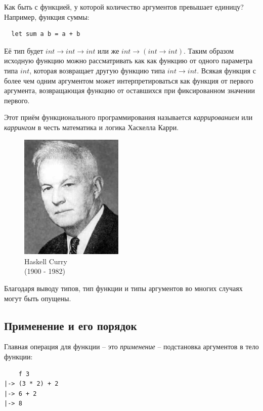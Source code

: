 \documentclass[a4paper,11pt]{article}
\begin{document}
Как быть с функцией, у которой количество аргументов превышает единицу? 
Например, функция суммы:
\begin{lstlisting}
  let sum a b = a + b
\end{lstlisting}

Её тип будет $int \rightarrow int \rightarrow int$ или же $int \rightarrow (int 
\rightarrow int)$. Таким образом исходную функцию можно рассматривать как
как функцию от одного параметра типа $int$, которая возвращает другую функцию
типа $int \rightarrow int$. Всякая функция с более чем одним аргументом 
может интерпретироваться как функция от первого аргумента, возвращающая функцию
от оставшихся при фиксированном значении первого. 

Этот приём функционального программирования называется \emph{каррированием} или
\emph{каррингом} в честь математика и логика Хаскелла Карри.

\begin{figure}[h]
    \begin{center}
        \includegraphics[height=60mm]{lecture1/curry.eps}
        \caption{Haskell Curry\\(1900 - 1982)}
    \end{center}
\end{figure}

Благодаря выводу типов, тип функции и типы аргументов во многих случаях могут
быть опущены.

\subsection{Применение и его порядок}

Главная операция для функции -- это \emph{применение} -- подстановка аргументов
в тело функции:
\begin{lstlisting}
    f 3
|-> (3 * 2) + 2
|-> 6 + 2
|-> 8
\end{lstlisting}
\end{document}
